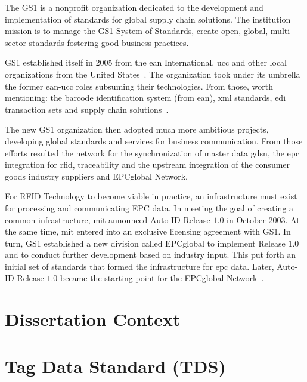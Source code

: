 The GS1 is a nonprofit organization dedicated to the development and implementation of standards for global supply chain solutions. 
The institution mission is to manage the GS1 System of Standards, create open, global, multi-sector standards fostering good business practices.

GS1 established itself in 2005 from the \ac{ean} International, \ac{ucc} and other local organizations from the United States~\cite{PublicationLEBENSMITTELZEITUNGa}.
The organization took under its umbrella the former \acs{ean}-\acs{ucc} roles subsuming their technologies. From those, worth mentioning: the barcode identification system (from \ac{ean}), \ac{xml} standards, \ac{edi} transaction sets and supply chain solutions~\cite{lahiriRFIDSourcebook2005}.

The new GS1 organization then adopted much more ambitious projects, developing global standards and services for business communication.
From those efforts resulted the network for the synchronization of master data \ac{gdsn}, the \ac{epc} integration for \ac{rfid}, traceability and the upstream integration of the consumer goods industry suppliers and EPCglobal Network.

For RFID Technology to become viable in practice, an infrastructure must exist for processing and communicating EPC data. In meeting the goal of creating a common infrastructure, \ac{mit} announced Auto-ID Release $1.0$ in October 2003. At the same time, \ac{mit} entered into an exclusive licensing agreement with GS1.
In turn, GS1 established a new division called EPCglobal to implement Release $1.0$ and to conduct further development based on industry input. This put forth an initial set of standards that formed the infrastructure for \ac{epc} data. Later, Auto-ID Release $1.0$ became the starting-point for the EPCglobal Network~\cite{GlobalRFIDValue}.



\section{Dissertation Context}


\section{Tag Data Standard (TDS)}

